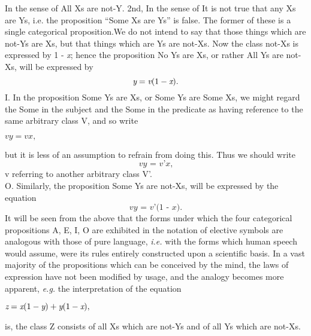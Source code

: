 \documentclass{article}
\begin{document}
{{{In the sense of All Xs are not-Y. 2nd, In the sense of It is not true that any Xs are Ys, i.e. the
proposition “Some Xs are Ys” is false. The former of these is a single categorical proposition.}}We do not intend to say that those things which are not-Ys are Xs,
but that things which are Ys are not-Xs. Now the class not-Xs is expressed by
1 - \textit x; hence the proposition No Ys are Xs, or rather All Ys are not-Xs, will be
expressed by
                                     \begin{equation}\textit y =\textit v(1 -\textit x).\end{equation}                              
\hspace{.2in}I. In the proposition Some Ys are Xs, or Some Ys are Some Xs, we might
regard the Some in the subject and the Some in the predicate as having reference
to the same arbitrary class V, and so write
                                       \begin{center}$\textit{vy} = \textit{vx},$\end{center}
but it is less of an assumption to refrain from doing this. Thus we should write
                                       \begin{equation}\textit{vy = v'x,}\end{equation}                                
v referring to another arbitrary class V'.\\\vspace{0.005in}
\hspace{.2in}O. Similarly, the proposition Some Ys are not-Xs, will be expressed by the
equation
                                   \begin{equation}\textit{vy = v'(1 - x).}\end{equation}                       
     It will be seen from the above that the forms under which the four categorical
propositions A, E, I, O are exhibited in the notation of elective symbols are
analogous with those of pure language, \textit{i.e.} with the forms which human speech
would assume, were its rules entirely constructed upon a scientific basis. In a
vast majority of the propositions which can be conceived by the mind, the laws
of expression have not been modified by usage, and the analogy becomes more
apparent, \textit{e.g.} the interpretation of the equation
                                \begin{center}$\textit z =\textit x(1 -\textit y) +\textit y(1 -\textit x),$\end{center}
is, the class Z consists of all Xs which are not-Ys and of all Ys which are not-Xs.\\

}
\end{document}
